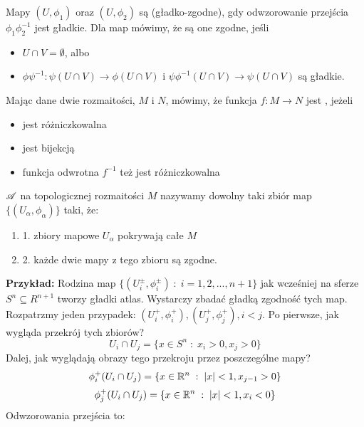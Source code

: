 \begin{definition}
Mapy $(U, \phi_1)$ oraz $(U, \phi_2)$ są  (gładko-zgodne), gdy odwzorowanie przejścia $\phi_1\phi_2^{-1}$ jest gładkie. Dla map  mówimy, że są one zgodne, jeśli 
\begin{itemize}
    \item $U\cap V=\emptyset$, albo
    \item $\phi\psi^{-1}:\psi(U\cap V)\to \phi(U\cap V)$ i $\psi\phi^{-1}(U\cap V)\to \psi(U\cap V)$ są gładkie.
\end{itemize}
\end{definition}
%
%

\begin{definition}[dyfeomorfizm]
Mając dane dwie rozmaitości, $M$ i $N$, mówimy, że funkcja $f:M\to N$ jest , jeżeli
\begin{itemize}
    \item jest różniczkowalna
    \item jest bijekcją
    \item funkcja odwrotna $f^{-1}$ też jest różniczkowalna
\end{itemize}
\end{definition}


\begin{definition}
     $\mathcal{A}$ na topologicznej rozmaitości $M$ nazywamy dowolny taki zbiór map $\{(U_\alpha,\phi_\alpha)\}$ taki, że:
    \begin{enumerate}
        \item 1. zbiory mapowe $U_\alpha$ pokrywają całe $M$
        \item 2. każde dwie mapy z tego zbioru są zgodne.
    \end{enumerate}
\end{definition}


\textbf{Przykład:}  Rodzina map $\{(U_i^\pm,\phi_i^\pm)\;:\;i=1,2,...,n+1\}$ jak wcześniej na sferze $S^n\subseteq R^{n+1}$ tworzy gładki atlas. Wystarczy zbadać gładką zgodność tych map. Rozpatrzmy jeden przypadek: $(U_i^+,\phi_i^+),(U_j^+,\phi_j^+),i<j$. Po pierwsze, jak wygląda przekrój tych zbiorów?
$$U_i\cap U_j=\{x\in S^n\;:\;x_i>0,x_j>0\}$$
Dalej, jak wyglądają obrazy tego przekroju przez poszczególne mapy?
$$\phi_i^+(U_i\cap U_j)=\{x\in\mathbb{R}^n\;:\;|x|<1, x_{j-1}>0\}$$
$$\phi_j^+(U_i\cap U_j)=\{x\in\mathbb{R}^n\;:\;|x|<1,x_i<0\}$$
Odwzorowania przejścia to:

